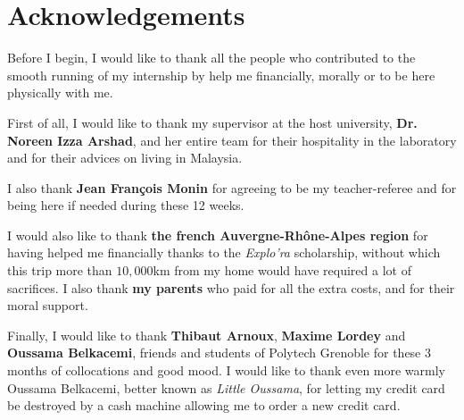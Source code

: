 \chapter*{Acknowledgements}

Before I begin, I would like to thank all the people who contributed to the smooth running of my internship by help me financially, morally or to be here physically with me.

First of all, I would like to thank my supervisor at the host university, \textbf{Dr. Noreen Izza Arshad}, and her entire team for their hospitality in the laboratory and for their advices on living in Malaysia.

I also thank \textbf{Jean François Monin} for agreeing to be my teacher-referee and for being here if needed during these 12 weeks.

I would also like to thank \textbf{the french Auvergne-Rhône-Alpes region} for having helped me financially thanks to the \textit{Explo'ra} scholarship, without which this trip more than $10,000$km from my home would have required a lot of sacrifices. I also thank \textbf{my parents} who paid for all the extra costs, and for their moral support.

Finally, I would like to thank \textbf{Thibaut Arnoux}, \textbf{Maxime Lordey} and \textbf{Oussama Belkacemi}, friends and students of Polytech Grenoble for these 3 months of collocations and good mood. I would like to thank even more warmly Oussama Belkacemi, better known as \textit{Little Oussama}, for letting my credit card be destroyed by a cash machine allowing me to order a new credit card.
